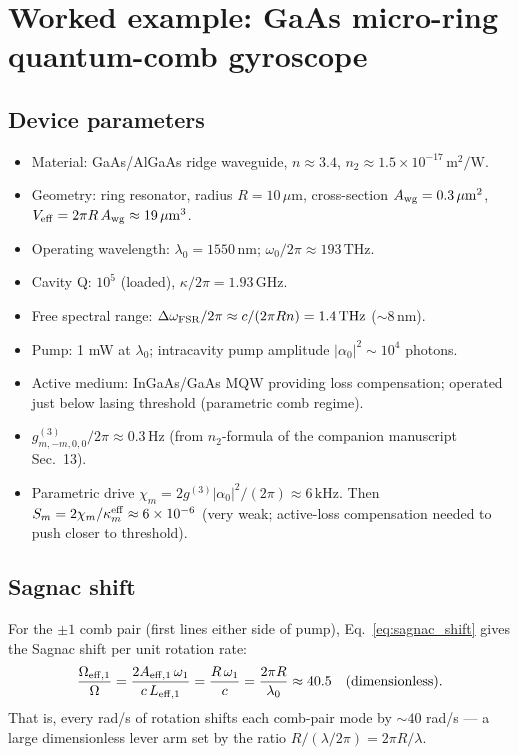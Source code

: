 \documentclass[11pt]{article}
\newcommand{\eff}{{\rm eff}}
\begin{document}
\section{Worked example: GaAs micro-ring quantum-comb gyroscope}
\label{sec:example}

\subsection{Device parameters}

\begin{itemize}\itemsep0em
\item Material: GaAs/AlGaAs ridge waveguide, $n\approx 3.4$,
  $n_2 \approx 1.5\times 10^{-17}\,\mathrm{m^2/W}$.
\item Geometry: ring resonator, radius $R = 10\,\mu\mathrm{m}$,
  cross-section $A_{\rm wg} = 0.3\,\mu\mathrm{m}^2$,
  $V_{\rm eff} = 2\pi R\,A_{\rm wg} \approx 19\,\mu\mathrm{m}^3$.
\item Operating wavelength: $\lambda_0 = 1550\,\mathrm{nm}$;
  $\omega_0/2\pi \approx 193\,\mathrm{THz}$.
\item Cavity Q: $10^5$ (loaded), $\kappa/2\pi = 1.93\,\mathrm{GHz}$.
\item Free spectral range: $\Delta\omega_{\rm FSR}/2\pi \approx
  c/(2\pi R n) = 1.4\,\mathrm{THz}$ ($\sim 8\,\mathrm{nm}$).
\item Pump: 1 mW at $\lambda_0$; intracavity pump amplitude
  $|\alpha_0|^2 \sim 10^4$ photons.
\item Active medium: InGaAs/GaAs MQW providing loss compensation;
  operated just below lasing threshold (parametric comb regime).
\item $g^{(3)}_{m,-m,0,0}/2\pi \approx 0.3\,\mathrm{Hz}$ (from
  $n_2$-formula of the companion manuscript Sec.~13).
\item Parametric drive $\chi_m = 2 g^{(3)}|\alpha_0|^2/(2\pi)
  \approx 6\,\mathrm{kHz}$.  Then
  $S_m = 2\chi_m/\kappa_m^\eff \approx 6\times 10^{-6}$ (very weak;
  active-loss compensation needed to push closer to threshold).
\end{itemize}

\subsection{Sagnac shift}
\label{sec:example_sagnac}

For the $\pm 1$ comb pair (first lines either side of pump),
Eq.~\eqref{eq:sagnac_shift} gives the Sagnac shift per unit rotation
rate:
\begin{equation}
  \frac{\Omega_{\eff,1}}{\Omega}
  = \frac{2 A_{\eff,1}\,\omega_1}{c\,L_{\eff,1}}
  = \frac{R\,\omega_1}{c}
  = \frac{2\pi R}{\lambda_0}
  \approx 40.5\quad(\text{dimensionless}).
  \label{eq:sagnac_numeric}
\end{equation}
That is, every rad/s of rotation shifts each comb-pair mode by
$\sim\!40$ rad/s --- a large dimensionless lever arm set by the ratio
$R/(\lambda/2\pi) = 2\pi R/\lambda$.
\end{document}
